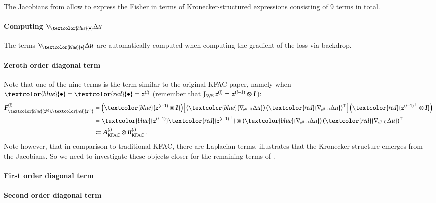 The Jacobians from  allow to express the Fisher in
terms of Kronecker-structured expressions consisting of 9 terms in total.




\paragraph{Computing $\grad{\textcolor{blue}{\bullet}}\Delta u$}
The terms $\grad{\textcolor{blue}{\bullet}}\Delta u$ are automatically computed when computing the gradient of the loss via backdrop.

\paragraph{Zeroth order diagonal term}
Note that one of the nine terms is the term similar to the original KFAC paper, namely
when $\textcolor{blue}{\bullet} = \textcolor{red}{\bullet} = \vz^{(i)}$
(remember that $\mathrm{J}_{{\boldsymbol{W}}^{(i)}} {\boldsymbol{z}}^{(i)} = {\boldsymbol{z}}^{(i-1)} \otimes {\boldsymbol{I}}$):
\begin{align}\label{eq:original-kfac}
  \begin{split}
    \mF^{(i)}_{\textcolor{blue}{\vz^{(i)}}, \textcolor{red}{\vz^{(i)}}}
    &=
      \left(
      \textcolor{blue}{\vz^{(i-1)} \otimes \mI}
      \right)
      \left[
      \left(
      \textcolor{blue}{\grad{\vz^{(i-1)}}\Delta u}
      \right)
      \left(
      \textcolor{red}{\grad{\vz^{(i-1)}}\Delta u}
      \right)^{\top}
      \right]
      \left(
      \textcolor{red}{{\vz^{(i-1)}}^{\top} \otimes \mI}
      \right)
    \\
    &=
      \textcolor{blue}{\vz^{(i-1)}}
      \textcolor{red}{{\vz^{(i-1)}}^{\top}}
      \otimes
      \left(
      \textcolor{blue}{\grad{\vz^{(i-1)}}\Delta u}
      \right)
      \left(
      \textcolor{red}{\grad{\vz^{(i-1)}}\Delta u}
      \right)^{\top}
    \\
    &\coloneqq \mA_{\text{KFAC}}^{(i)} \otimes \mB_{\text{KFAC}}^{(i)}\,.
  \end{split}
\end{align}
Note however, that in comparison to traditional KFAC, there are Laplacian terms.
 illustrates that the Kronecker structure emerges from
the Jacobians. So we need to investigate these objects closer for the remaining
terms of .


\paragraph{First order diagonal term}

\paragraph{Second order diagonal term}


